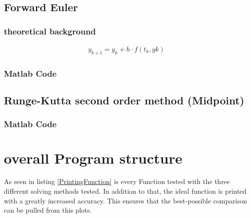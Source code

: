 \subsection{Forward Euler}
\subsubsection{theoretical background}
\begin{align}
    y_{k+1}=y_k+h\cdot f(t_k, yk)
\end{align}
\subsubsection{Matlab Code}


\subsection{Runge-Kutta second order method (Midpoint)}
\subsubsection{Matlab Code}


\section{overall Program structure}

As seen in listing \ref{PrintingFunction} is every Function tested with the three different solving methods tested. In addition to that, the ideal function is printed with a greatly increased accuracy. This ensures that the best-possible comparison can be pulled from this plots. 

